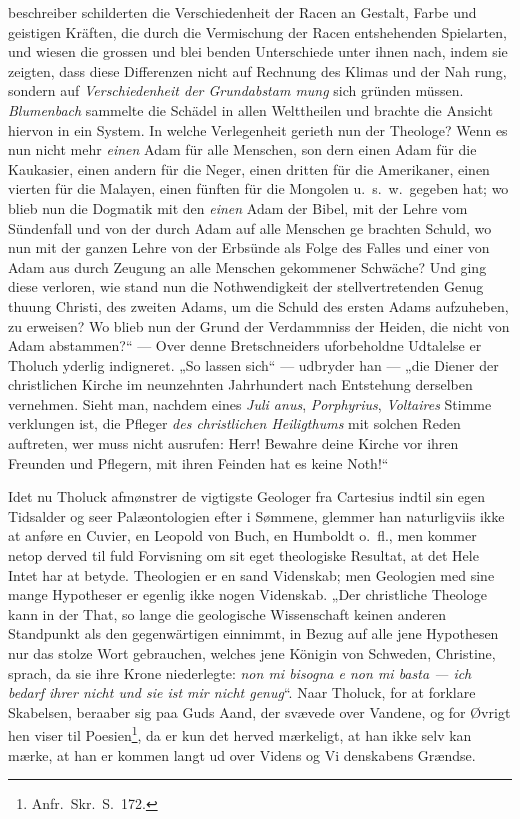\documentclass[12pt,a4paper]{article}
\newcommand{\opage}[1]{\marginnote{\footnotesize\textit{[#1]}}}
\begin{document}
beschreiber schilderten die Verschiedenheit der Racen an Gestalt,
Farbe und geistigen Kräften, die durch die Vermischung der
Racen entshehenden Spielarten, und wiesen die grossen und blei\-%
benden Unterschiede unter ihnen nach, indem sie zeigten, dass
diese Differenzen nicht auf Rechnung des Klimas und der Nah\-%
rung, sondern auf \emph{Verschiedenheit der Grundabstam\-%
mung} sich gründen müssen. \emph{Blumenbach} sammelte die
Schädel in allen Welttheilen und brachte die Ansicht hiervon in
ein System. In welche Verlegenheit gerieth nun der Theologe?
Wenn es nun nicht mehr \emph{einen} Adam für alle Menschen, son\-%
dern einen Adam für die Kaukasier, einen andern für die Neger,
einen dritten für die Amerikaner, einen vierten für die Malayen,
einen fünften für die Mongolen u.\ s.\ w.\ gegeben hat; wo blieb
nun die Dogmatik mit den \emph{einen} Adam der Bibel, mit der Lehre
vom Sündenfall und von der durch Adam auf alle Menschen ge\-%
brachten Schuld, wo nun mit der ganzen Lehre von der Erbsünde
als Folge des Falles und einer von Adam aus durch Zeugung an
alle Menschen gekommener Schwäche? Und ging diese verloren,
wie stand nun die Nothwendigkeit der stellvertretenden Genug\-%
thuung Christi, des zweiten Adams, um die Schuld des ersten
Adams aufzuheben, zu erweisen? Wo blieb nun der Grund der
Verdammniss der Heiden, die nicht von Adam abstammen?“ ---
Over denne Bretschneiders uforbeholdne Udtalelse er Tholuch
yderlig indigneret. „So lassen sich“ --- udbryder han --- „die
\opage{37}Diener der christlichen Kirche im neunzehnten Jahrhundert nach
Entstehung derselben vernehmen. Sieht man, nachdem eines \emph{Juli\-%
anus}, \emph{Porphyrius}, \emph{Voltaires} Stimme verklungen ist, die Pfleger
\emph{des christlichen Heiligthums} mit solchen Reden auftreten,
wer muss nicht ausrufen: Herr! Bewahre deine Kirche vor ihren
Freunden und Pflegern, mit ihren Feinden hat es keine Noth!“

Idet nu Tholuck afmønstrer de vigtigste Geologer fra Cartesius
indtil sin egen Tidsalder og seer Palæontologien efter i Sømmene,
glemmer han naturligviis ikke at anføre en Cuvier, en Leopold
von Buch, en Humboldt o.\ fl., men kommer netop derved til fuld
Forvisning om sit eget theologiske Resultat, at det Hele Intet har
at betyde. Theologien er en sand Videnskab; men Geologien med
sine mange Hypotheser er egenlig ikke nogen Videnskab. „Der
christliche Theologe kann in der That, so lange die geologische
Wissenschaft keinen anderen Standpunkt als den gegenwärtigen
einnimmt, in Bezug auf alle jene Hypothesen nur das stolze Wort
gebrauchen, welches jene Königin von Schweden, Christine, sprach,
da sie ihre Krone niederlegte: \emph{non mi bisogna e non mi
basta --- ich bedarf ihrer nicht und sie ist mir nicht
genug}“. Naar Tholuck, for at forklare Skabelsen, beraaber sig
paa Guds Aand, der svævede over Vandene, og for Øvrigt hen\-%
viser til Poesien\footnote{Anfr.\ Skr.\ S.\ 172.}, %
da er kun det herved mærkeligt, at han ikke
selv kan mærke, at han er kommen langt ud over Videns og Vi\-%
denskabens Grændse.
\end{document}
